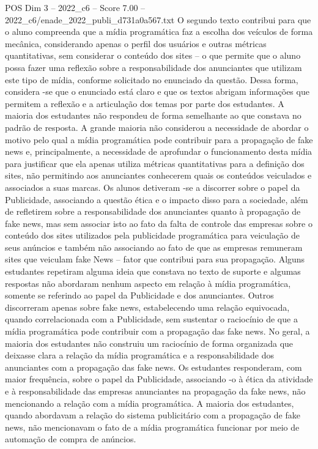 \begin{textsample}{POS Dim 3 – 2022\_c6 – Score 7.00 – 2022\_c6/enade\_2022\_publi\_d731a0a567.txt}
O segundo texto contribui para que o aluno compreenda que a mídia programática faz a escolha dos veículos de forma mecânica, considerando apenas o perfil dos usuários e outras métricas quantitativas, sem considerar o conteúdo dos sites – o que permite que o aluno possa fazer uma reflexão sobre a responsabilidade dos anunciantes que utilizam este tipo de mídia, conforme solicitado no enunciado da questão.
Dessa forma, considera -se que o enunciado está claro e que os textos abrigam informações que permitem a reflexão e a articulação dos temas por parte dos estudantes.
A maioria dos estudantes não respondeu de forma semelhante ao que constava no padrão de resposta.
A grande maioria não considerou a necessidade de abordar o motivo pelo qual a mídia programática pode contribuir para a propagação de fake news e, principalmente, a necessidade de aprofundar o funcionamento desta mídia para justificar que ela apenas utiliza métricas quantitativas para a definição dos sites, não permitindo aos anunciantes conhecerem quais os conteúdos veiculados e associados a suas marcas.
Os alunos detiveram -se a discorrer sobre o papel da Publicidade, associando a questão ética e o impacto disso para a sociedade, além de refletirem sobre a responsabilidade dos anunciantes quanto à propagação de fake news, mas sem associar isto ao fato da falta de controle das empresas sobre o conteúdo dos sites utilizados pela publicidade programática para veiculação de seus anúncios e também não associando ao fato de que as empresas remuneram sites que veiculam fake News – fator que contribui para sua propagação.
Alguns estudantes repetiram alguma ideia que constava no texto de suporte e algumas respostas não abordaram nenhum aspecto em relação à mídia programática, somente se referindo ao papel da Publicidade e dos anunciantes.
Outros discorreram apenas sobre fake news, estabelecendo uma relação equivocada, quando correlacionada com a Publicidade, sem sustentar o raciocínio de que a mídia programática pode contribuir com a propagação das fake news.
No geral, a maioria dos estudantes não construiu um raciocínio de forma organizada que deixasse clara a relação da mídia programática e a responsabilidade dos anunciantes com a propagação das fake news.
Os estudantes responderam, com maior frequência, sobre o papel da Publicidade, associando -o à ética da atividade e à responsabilidade das empresas anunciantes na propagação da fake news, não mencionando a relação com a mídia programática.
A maioria dos estudantes, quando abordavam a relação do sistema publicitário com a propagação de fake news, não mencionavam o fato de a mídia programática funcionar por meio de automação de compra de anúncios.

\end{textsample}
